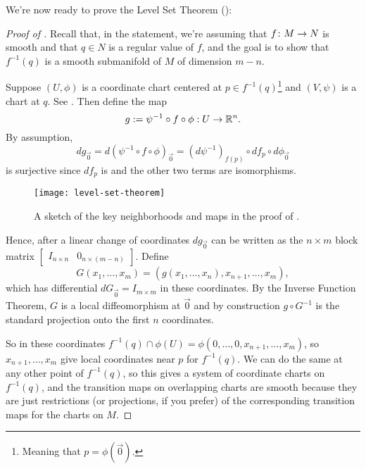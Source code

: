 We're now ready to prove the Level Set Theorem ():

\begin{proof}[Proof of ]
	Recall that, in the statement, we're assuming that $f\colon\thinspace\! M \to N$ is smooth and that $q \in N$ is a regular value of $f$, and the goal is to show that $f^{-1}(q)$ is a smooth submanifold of $M$ of dimension $m-n$.
	
	Suppose $(U,\phi)$ is a coordinate chart centered at $p \in f^{-1}(q)$\footnote{Meaning that $p = \phi(\vec{0})$.} and $(V, \psi)$ is a chart at $q$. See . Then define the map
	\[
		g := \psi^{-1} \circ f \circ \phi: U \to \mathbb{R}^n.
	\]
	By assumption,
	\[
		dg_{\vec{0}} = d(\psi^{-1} \circ f \circ \phi)_{\vec{0}} = (d \psi^{-1})_{f(p)} \circ df_p \circ d\phi_{\vec{0}}
	\]
	is surjective since $df_p$ is and the other two terms are isomorphisms.
	
	\begin{figure}[htbp]
		\centering
			\texttt{[image: level-set-theorem]}
		\caption{A sketch of the key neighborhoods and maps in the proof of .}
		\label{fig:level set theorem}
	\end{figure}
	
	Hence, after a linear change of coordinates $dg_{\vec{0}}$ can be written as the $n \times m$ block matrix $\begin{bmatrix} I_{n \times n} & 0_{n \times (m-n)} \end{bmatrix}$. Define
	\[
		G(x_1, \dots , x_m) = (g(x_1, \dots , x_n), x_{n+1}, \dots , x_m),
	\]
	which has differential $dG_{\vec{0}} = I_{m \times m}$ in these coordinates. By the Inverse Function Theorem, $G$ is a local diffeomorphism at $\vec{0}$ and by construction $g \circ G^{-1}$ is the standard projection onto the first $n$ coordinates.
	
	So in these coordinates $f^{-1}(q) \cap \phi(U) = \phi(0, \dots , 0, x_{n+1}, \dots , x_m)$, so $x_{n+1} , \dots , x_m$ give local coordinates near $p$ for $f^{-1}(q)$. We can do the same at any other point of $f^{-1}(q)$, so this gives a system of coordinate charts on $f^{-1}(q)$, and the transition maps on overlapping charts are smooth because they are just restrictions (or projections, if you prefer) of the corresponding transition maps for the charts on $M$.
\end{proof}